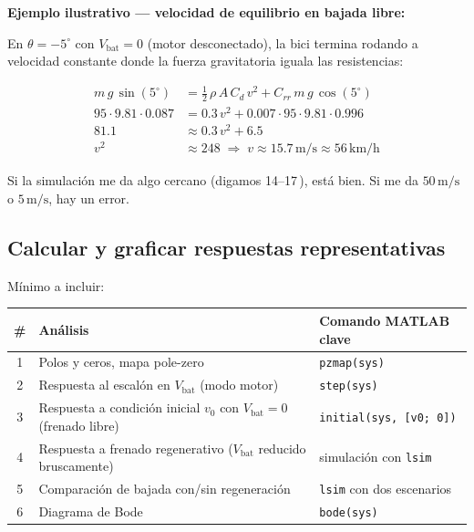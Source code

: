 \documentclass[11pt,a4paper]{article}
\newcommand{\unit}[1]{\,\mathrm{#1}}
\begin{document}
\begin{ejemplo}
\textbf{Ejemplo ilustrativo --- velocidad de equilibrio en bajada libre:}

En $\theta = -5^\circ$ con $V_{\text{bat}}=0$ (motor desconectado), la bici termina rodando a velocidad constante donde la fuerza gravitatoria iguala las resistencias:

\begin{align*}
m\,g\,\sin(5^\circ) &= \tfrac{1}{2}\,\rho\,A\,C_d\,v^2 + C_{rr}\,m\,g\,\cos(5^\circ) \\
95 \cdot 9.81 \cdot 0.087 &= 0.3\,v^2 + 0.007 \cdot 95 \cdot 9.81 \cdot 0.996 \\
81.1 &\approx 0.3\,v^2 + 6.5 \\
v^2 &\approx 248 \;\Rightarrow\; v \approx 15.7\unit{m/s} \approx 56\unit{km/h}
\end{align*}

Si la simulación me da algo cercano (digamos 14--17\unit{m/s}), está bien. Si me da $50\unit{m/s}$ o $5\unit{m/s}$, hay un error.
\end{ejemplo}

\subsection{Calcular y graficar respuestas representativas}

Mínimo a incluir:

\begin{table}[h]
\centering
\begin{tabularx}{\linewidth}{c X l}
\toprule
\# & Análisis & Comando MATLAB clave \\
\midrule
1 & Polos y ceros, mapa pole-zero & \texttt{pzmap(sys)} \\
2 & Respuesta al escalón en $V_{\text{bat}}$ (modo motor) & \texttt{step(sys)} \\
3 & Respuesta a condición inicial $v_0$ con $V_{\text{bat}}=0$ (frenado libre) & \texttt{initial(sys, [v0; 0])} \\
4 & Respuesta a frenado regenerativo ($V_{\text{bat}}$ reducido bruscamente) & simulación con \texttt{lsim} \\
5 & Comparación de bajada con/sin regeneración & \texttt{lsim} con dos escenarios \\
6 & Diagrama de Bode & \texttt{bode(sys)} \\
\bottomrule
\end{tabularx}
\end{table}
\end{document}
